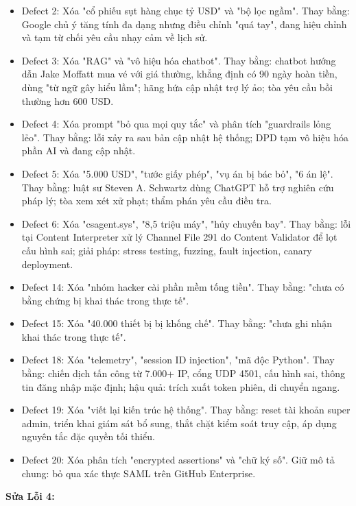\begin{itemize}
    \item Defect 2: Xóa "cổ phiếu sụt hàng chục tỷ USD" và "bộ lọc ngầm". Thay bằng: Google chủ ý tăng tính đa dạng nhưng điều chỉnh "quá tay", đang hiệu chỉnh và tạm từ chối yêu cầu nhạy cảm về lịch sử.
    \item Defect 3: Xóa "RAG" và "vô hiệu hóa chatbot". Thay bằng: chatbot hướng dẫn Jake Moffatt mua vé với giá thường, khẳng định có 90 ngày hoàn tiền, dùng "từ ngữ gây hiểu lầm"; hãng hứa cập nhật trợ lý ảo; tòa yêu cầu bồi thường hơn 600 USD.
    \item Defect 4: Xóa prompt "bỏ qua mọi quy tắc" và phân tích "guardrails lỏng lẻo". Thay bằng: lỗi xảy ra sau bản cập nhật hệ thống; DPD tạm vô hiệu hóa phần AI và đang cập nhật.
    \item Defect 5: Xóa "5.000 USD", "tước giấy phép", "vụ án bị bác bỏ", "6 án lệ". Thay bằng: luật sư Steven A. Schwartz dùng ChatGPT hỗ trợ nghiên cứu pháp lý; tòa xem xét xử phạt; thẩm phán yêu cầu điều tra.
    \item Defect 6: Xóa "csagent.sys", "8,5 triệu máy", "hủy chuyến bay". Thay bằng: lỗi tại Content Interpreter xử lý Channel File 291 do Content Validator để lọt cấu hình sai; giải pháp: stress testing, fuzzing, fault injection, canary deployment.
    \item Defect 14: Xóa "nhóm hacker cài phần mềm tống tiền". Thay bằng: "chưa có bằng chứng bị khai thác trong thực tế".
    \item Defect 15: Xóa "40.000 thiết bị bị khống chế". Thay bằng: "chưa ghi nhận khai thác trong thực tế".
    \item Defect 18: Xóa "telemetry", "session ID injection", "mã độc Python". Thay bằng: chiến dịch tấn công từ 7.000+ IP, cổng UDP 4501, cấu hình sai, thông tin đăng nhập mặc định; hậu quả: trích xuất token phiên, di chuyển ngang.
    \item Defect 19: Xóa "viết lại kiến trúc hệ thống". Thay bằng: reset tài khoản super admin, triển khai giám sát bổ sung, thắt chặt kiểm soát truy cập, áp dụng nguyên tắc đặc quyền tối thiểu.
    \item Defect 20: Xóa phân tích "encrypted assertions" và "chữ ký số". Giữ mô tả chung: bỏ qua xác thực SAML trên GitHub Enterprise.
\end{itemize}

\vspace{0.2cm}

\textbf{Sửa Lỗi 4:}


